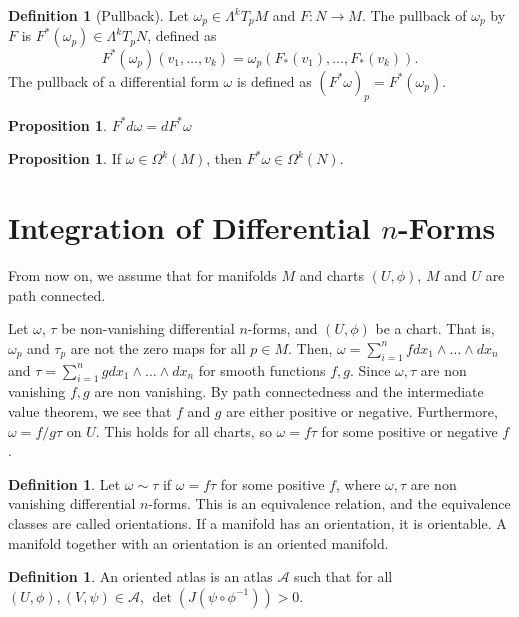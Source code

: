 \documentclass[]{article}
\DeclareMathOperator{\Det}{det}
\theoremstyle{definition}
\theoremstyle{definition}
\newtheorem{definition}[theorem]{Definition} %
\newtheorem{proposition}[theorem]{Proposition}
\begin{document}
\begin{definition}[Pullback]
    Let $\omega_p\in \Lambda^kT_pM$ and $F:N \rightarrow  M$. The pullback of $\omega_p$ by $F$ is $F^*(\omega_p)\in \Lambda^kT_pN$, defined as \[F^*(\omega_p)(v_1,\dots,v_k)=\omega_p(F_*(v_1),\dots, F_*(v_k)).\]
    The pullback of a differential form $\omega$ is defined as $(F^*\omega)_p=F^*(\omega_p)$.
\end{definition}

\begin{proposition}
    $F^*d\omega=dF^*\omega$
\end{proposition}

\begin{proposition}
    If $\omega\in \Omega^k(M)$, then $F^*\omega\in \Omega^k(N)$.
\end{proposition}

\section{Integration of Differential $n$-Forms}
From now on, we assume that for manifolds $M$ and charts $(U, \phi)$, $M$ and $U$ are path connected.

Let $\omega$, $\tau$ be non-vanishing differential $n$-forms, and $(U, \phi)$ be a chart. That is, $\omega_p$ and $\tau_p$ are not the zero maps for all $p\in M$. Then, $\omega=\sum_{i=1}^{n}f dx_1\wedge\dots\wedge dx_n$ and $\tau=\sum_{i=1}^{n}g dx_1\wedge\dots\wedge dx_n$ for smooth functions $f, g$. Since $\omega, \tau$ are non vanishing $f, g$ are non vanishing. By path connectedness and the intermediate value theorem, we see that $f$ and $g$ are either positive or negative. Furthermore, $\omega=f/g\tau$ on $U$. This holds for all charts, so $\omega=f\tau$ for some positive or negative $f$.
\begin{definition}
    Let $\omega\sim \tau$ if $\omega=f\tau$ for some positive $f$, where $\omega, \tau$ are non vanishing differential $n$-forms. This is an equivalence relation, and the equivalence classes are called orientations. If a manifold has an orientation, it is orientable. A manifold together with an orientation is an oriented manifold.
\end{definition}

\begin{definition}
    An oriented atlas is an atlas $\mathcal{A}$ such that for all $(U, \phi),(V, \psi)\in \mathcal{A}$, $\Det(J(\psi\circ\phi ^{-1}))>0$.
\end{definition}
\end{document}
